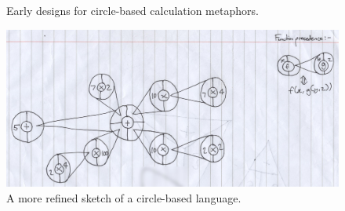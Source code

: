 \documentclass[12pt,twoside,notitlepage,xetex]{report}
\begin{document}
\begin{center}
\begin{figure}[H]
\begin{center}
\end{center}
\caption{Early designs for circle-based calculation metaphors.}
\label{fig:Circs1}
\end{figure}
\end{center}

\begin{center}
\begin{figure}
\begin{center}
\includegraphics[width=\textwidth]{figs/mockups/sketches/21/21a.jpg}
\end{center}
\caption{A more refined sketch of a circle-based language.}
\label{fig:Circs2}
\end{figure}
\end{center}
\end{document}
